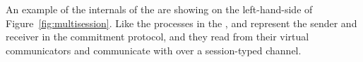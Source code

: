 \documentclass[conference]{IEEEtran}
\begin{document}
An example of the internals of the \fwrapper are showing on the left-hand-side of Figure~\ref{fig:multisession}.
Like the  processes in the \partywrapper,  and  represent the sender and receiver in the commitment protocol, and they read from their virtual communicators and communicate with \Fcom over a session-typed channel.


%

%

\pagebreak

%

%

%
%
%
%
%
%
%
%
%
\end{document}

